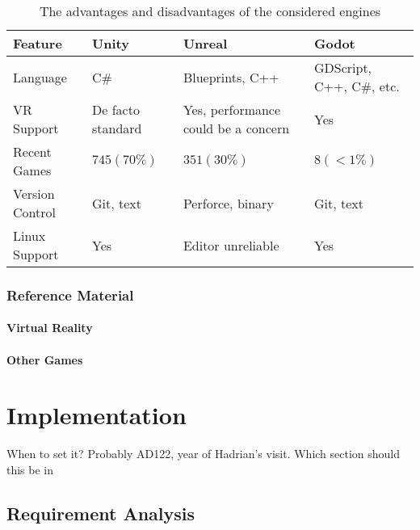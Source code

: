 \documentclass[12pt, a4paper]{report}
\begin{document}
\begin{table}
  \caption{The advantages and disadvantages of the considered engines}
  \label{table:engine_compare}
  \begin{tabularx}{\textwidth}{lLLL}\toprule
    Feature & Unity & Unreal & Godot \\\midrule

    Language & C\# & Blueprints, C++ & GDScript, C++, C\#, etc. \\
    VR Support & De facto standard & Yes, performance could be a
    concern & Yes \\
    Recent Games & $745 (70\%)$ & $351 (30\%)$ & $8 (<1\%)$ \\
    Version Control & Git, text & Perforce, binary & Git, text \\
    Linux Support & Yes & Editor unreliable & Yes \\

    \bottomrule
  \end{tabularx}
\end{table}

\subsection{Reference Material}

\subsubsection{Virtual Reality}


\subsubsection{Other Games}

\chapter{Implementation}

\todo
{When to set it? Probably AD122, year of Hadrian's visit. Which section should
this be in}

\section{Requirement Analysis}
\end{document}
